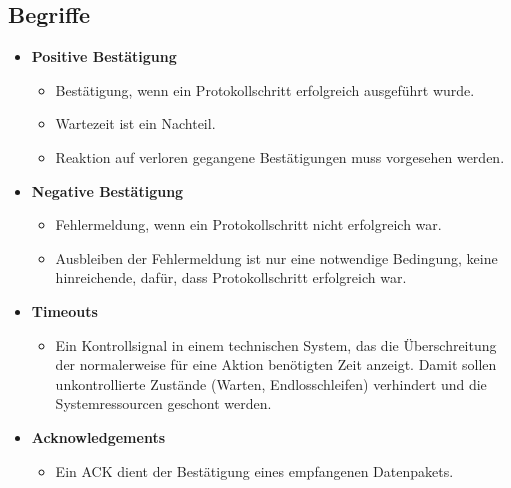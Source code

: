 \documentclass{article} %
\begin{document}
	\subsection{Begriffe}
	\begin{itemize}
		\item \textbf{Positive Bestätigung}
		\begin{itemize}
			\item Bestätigung, wenn ein Protokollschritt erfolgreich ausgeführt wurde.
			\item Wartezeit ist ein Nachteil.
			\item Reaktion auf verloren gegangene Bestätigungen muss
			vorgesehen werden.
		\end{itemize}
		\item \textbf{Negative Bestätigung}
		\begin{itemize}
			\item Fehlermeldung, wenn ein Protokollschritt nicht erfolgreich war.
			\item Ausbleiben der Fehlermeldung ist nur eine notwendige
			Bedingung, keine hinreichende, dafür, dass Protokollschritt
			erfolgreich war.
		\end{itemize}		
		\item \textbf{Timeouts}
		\begin{itemize}
			\item Ein Kontrollsignal in einem technischen System, das die Überschreitung der normalerweise für eine Aktion benötigten Zeit anzeigt. Damit sollen unkontrollierte Zustände (Warten, Endlosschleifen) verhindert und die Systemressourcen geschont werden.\cite{timeout}
		\end{itemize}		
		\item \textbf{Acknowledgements}
		\begin{itemize}
			\item Ein ACK dient der Bestätigung eines empfangenen Datenpakets.
		\end{itemize}
	\end{itemize}
	
\end{document}
